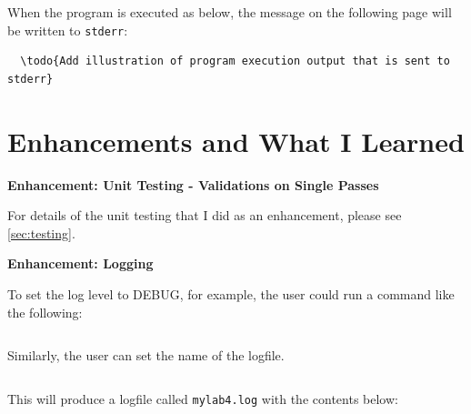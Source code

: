 \documentclass[10pt,letterpaper,final]{report}
\begin{document}
\noindent When the program is executed as below, the message on the following page will be written to \texttt{stderr}:

\pagebreak

\begin{verbatim}
  \todo{Add illustration of program execution output that is sent to stderr}
\end{verbatim}

\pagebreak
\section{Enhancements and What I Learned}\label{sec:enhancements-and-what-I-learned}

\noindent \textbf{Enhancement: Unit Testing - Validations on Single Passes}
\medskip

For details of the unit testing that I did as an enhancement, please see \ref{sec:testing}.

\medskip
\noindent \textbf{Enhancement: Logging}
\medskip



To set the log level to DEBUG, for example, the user could run a command like the following:

\begin{verbatim}
\end{verbatim}

Similarly, the user can set the name of the logfile.

\begin{verbatim}
\end{verbatim}

This will produce a logfile called \texttt{mylab4.log} with the contents below:

\begin{verbatim}
\end{verbatim}
\end{document}
